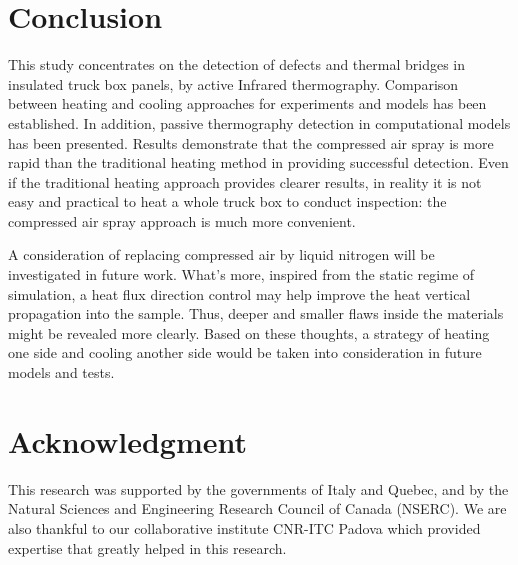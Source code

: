 \documentclass{tQRT2e}
\begin{document}
\section{Conclusion}
This study concentrates on the detection of defects and thermal bridges in insulated truck box panels, by active Infrared thermography. Comparison between heating and cooling approaches for experiments and models has been established. In addition, passive thermography detection in computational models has been presented. Results demonstrate that the compressed air spray is more rapid than the traditional heating method in providing successful detection. Even if the traditional heating approach provides clearer results, in reality it is not easy and practical to heat a whole truck box to conduct inspection: the compressed air spray approach is much more convenient. 

A consideration of replacing compressed air by liquid nitrogen will be investigated in future work. What’s more, inspired from the static regime of simulation, a heat flux direction control may help improve the heat vertical propagation into the sample. Thus, deeper and smaller flaws inside the materials might be revealed more clearly. Based on these thoughts, a strategy of heating one side and cooling another side would be taken into consideration in future models and tests.


\section*{Acknowledgment}
This research was supported by the governments of Italy and Quebec, and by the Natural Sciences and Engineering Research Council of Canada (NSERC). We are also thankful to our collaborative institute CNR-ITC Padova which provided expertise that greatly helped in this research. 



\end{document}
